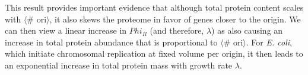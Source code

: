 
%
%
%
%
%

This result provides important evidence that although total protein content
scales with $\langle$\# ori$\rangle$, it also skews the proteome in favor of
genes closer to the origin.  We can then view a linear
increase in $Phi_R$ (and therefore, $\lambda$) as also causing an increase in
total protein abundance that is proportional to $\langle$\# ori$\rangle$.
For \textit{E. coli}, which initiate chromosomal replication at fixed volume per origin,
it then leads to an exponential increase in total protein mass with growth rate $\lambda$.

